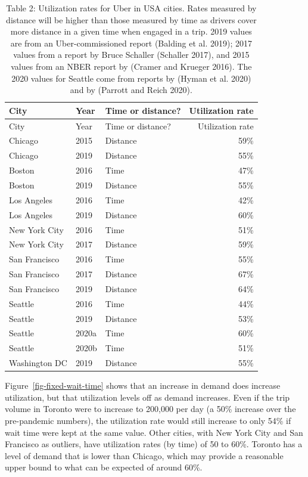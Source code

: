 \documentclass[
  letterpaper,
]{article}
\begin{document}
\begin{longtable}[]{@{}lllr@{}}
\caption{Table 2: Utilization rates for Uber in USA cities. Rates
measured by distance will be higher than those measured by time as
drivers cover more distance in a given time when engaged in a trip. 2019
values are from an Uber-commissioned report (Balding et al. 2019); 2017
values from a report by Bruce Schaller (Schaller 2017), and 2015 values
from an NBER report by (Cramer and Krueger 2016). The 2020 values for
Seattle come from reports by (Hyman et al. 2020) and by (Parrott and
Reich 2020).}\tabularnewline
\toprule()
City & Year & Time or distance? & Utilization rate \\
\midrule()
\endfirsthead
\toprule()
City & Year & Time or distance? & Utilization rate \\
\midrule()
\endhead
Chicago & 2015 & Distance & 59\% \\
Chicago & 2019 & Distance & 55\% \\
Boston & 2016 & Time & 47\% \\
Boston & 2019 & Distance & 55\% \\
Los Angeles & 2016 & Time & 42\% \\
Los Angeles & 2019 & Distance & 60\% \\
New York City & 2016 & Time & 51\% \\
New York City & 2017 & Distance & 59\% \\
San Francisco & 2016 & Time & 55\% \\
San Francisco & 2017 & Distance & 67\% \\
San Francisco & 2019 & Distance & 64\% \\
Seattle & 2016 & Time & 44\% \\
Seattle & 2019 & Distance & 53\% \\
Seattle & 2020a & Time & 60\% \\
Seattle & 2020b & Time & 51\% \\
Washington DC & 2019 & Distance & 55\% \\
\bottomrule()
\end{longtable}

Figure~\ref{fig-fixed-wait-time} shows that an increase in demand does
increase utilization, but that utilization levels off as demand
increases. Even if the trip volume in Toronto were to increase to
200,000 per day (a 50\% increase over the pre-pandemic numbers), the
utilization rate would still increase to only 54\% if wait time were
kept at the same value. Other cities, with New York City and San
Francisco as outliers, have utilization rates (by time) of 50 to 60\%.
Toronto has a level of demand that is lower than Chicago, which may
provide a reasonable upper bound to what can be expected of around 60\%.
\end{document}
